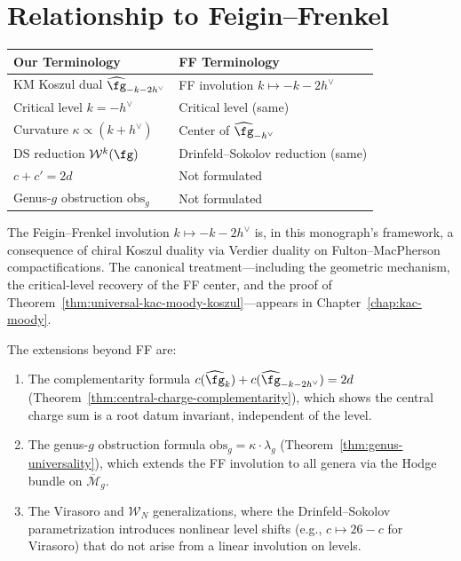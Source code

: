 \section{Relationship to Feigin--Frenkel}

\begin{tabular}{>{\raggedright\arraybackslash}p{}>{\raggedright\arraybackslash}p{}}
\textbf{Our Terminology} & \textbf{FF Terminology} \\
\hline
KM Koszul dual $\widehat{\fg}_{-k-2h^\vee}$ & FF involution $k \mapsto -k - 2h^\vee$ \\
Critical level $k = -h^\vee$ & Critical level (same) \\
Curvature $\kappa \propto (k + h^\vee)$ & Center of $\widehat{\fg}_{-h^\vee}$ \\
DS reduction $\mathcal{W}^k(\fg)$ & Drinfeld--Sokolov reduction (same) \\
$c + c' = 2d$ & Not formulated \\
Genus-$g$ obstruction $\mathrm{obs}_g$ & Not formulated \\
\end{tabular}

\begin{remark}\label{rem:feigin-frenkel-comparison}
The Feigin--Frenkel involution $k \mapsto -k - 2h^\vee$ is, in this
monograph's framework, a consequence of chiral Koszul duality via
Verdier duality on Fulton--MacPherson compactifications.  The
canonical treatment---including the geometric mechanism, the
critical-level recovery of the FF center, and the proof of
Theorem~\ref{thm:universal-kac-moody-koszul}---appears in
Chapter~\ref{chap:kac-moody}.

The extensions beyond FF are:
\begin{enumerate}[label=(\roman*)]
\item The complementarity formula $c(\widehat{\fg}_k) + c(\widehat{\fg}_{-k-2h^\vee}) = 2d$
  (Theorem~\ref{thm:central-charge-complementarity}), which shows the
  central charge sum is a root datum invariant, independent of the level.
\item The genus-$g$ obstruction formula $\mathrm{obs}_g = \kappa \cdot \lambda_g$
  (Theorem~\ref{thm:genus-universality}), which extends the FF involution
  to all genera via the Hodge bundle on $\overline{\mathcal{M}}_g$.
\item The Virasoro and $\mathcal{W}_N$ generalizations, where the
  Drinfeld--Sokolov parametrization introduces nonlinear level shifts
  (e.g., $c \mapsto 26 - c$ for Virasoro) that do not arise from a linear
  involution on levels.
\end{enumerate}
\end{remark}



